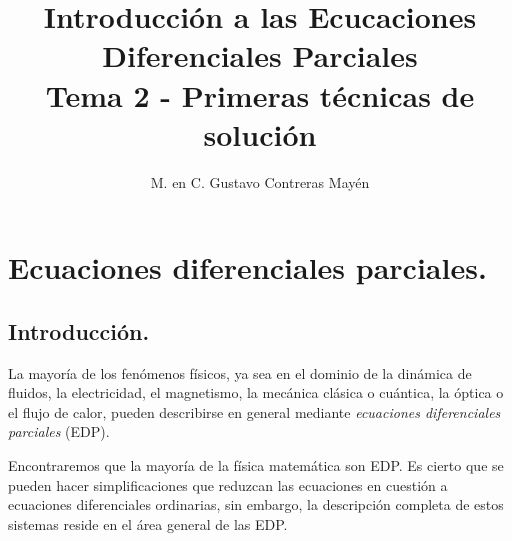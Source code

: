
\usepackage{apacite}
\title{Introducción a las Ecucaciones Diferenciales Parciales \\[0.3em]  \large{Tema 2 - Primeras técnicas de solución} \vspace{-3ex}}
\author{M. en C. Gustavo Contreras Mayén}
\date{ }

\vspace{-4cm}
\maketitle
\fontsize{14}{14}\selectfont
\tableofcontents
\newpage

\section{Ecuaciones diferenciales parciales.}

\subsection{Introducción.}

La mayoría de los fenómenos físicos, ya sea en el dominio de la dinámica de fluidos, la electricidad, el magnetismo, la mecánica clásica o cuántica, la óptica o el flujo de calor, pueden describirse en general mediante \emph{ecuaciones diferenciales parciales} (EDP).
\par
Encontraremos que la mayoría de la física matemática son EDP. Es cierto que se pueden hacer simplificaciones que reduzcan las ecuaciones en cuestión a ecuaciones diferenciales ordinarias, sin embargo, la descripción completa de estos sistemas reside en el área general de las EDP.
